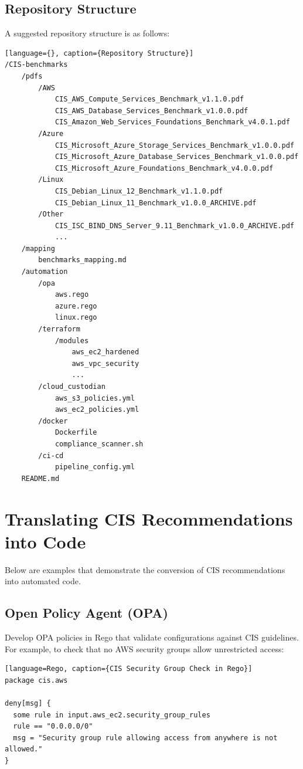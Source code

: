 \documentclass[12pt]{article}
\begin{document}
\subsection{Repository Structure}
A suggested repository structure is as follows:
\begin{verbatim}[language={}, caption={Repository Structure}]
/CIS-benchmarks
    /pdfs
        /AWS
            CIS_AWS_Compute_Services_Benchmark_v1.1.0.pdf
            CIS_AWS_Database_Services_Benchmark_v1.0.0.pdf
            CIS_Amazon_Web_Services_Foundations_Benchmark_v4.0.1.pdf
        /Azure
            CIS_Microsoft_Azure_Storage_Services_Benchmark_v1.0.0.pdf
            CIS_Microsoft_Azure_Database_Services_Benchmark_v1.0.0.pdf
            CIS_Microsoft_Azure_Foundations_Benchmark_v4.0.0.pdf
        /Linux
            CIS_Debian_Linux_12_Benchmark_v1.1.0.pdf
            CIS_Debian_Linux_11_Benchmark_v1.0.0_ARCHIVE.pdf
        /Other
            CIS_ISC_BIND_DNS_Server_9.11_Benchmark_v1.0.0_ARCHIVE.pdf
            ...
    /mapping
        benchmarks_mapping.md
    /automation
        /opa
            aws.rego
            azure.rego
            linux.rego
        /terraform
            /modules
                aws_ec2_hardened
                aws_vpc_security
                ...
        /cloud_custodian
            aws_s3_policies.yml
            aws_ec2_policies.yml
        /docker
            Dockerfile
            compliance_scanner.sh
        /ci-cd
            pipeline_config.yml
    README.md
\end{verbatim}

\section{Translating CIS Recommendations into Code}
Below are examples that demonstrate the conversion of CIS recommendations into automated code.

\subsection{Open Policy Agent (OPA)}
Develop OPA policies in Rego that validate configurations against CIS guidelines. For example, to check that no AWS security groups allow unrestricted access:
\begin{verbatim}[language=Rego, caption={CIS Security Group Check in Rego}]
package cis.aws

deny[msg] {
  some rule in input.aws_ec2.security_group_rules
  rule == "0.0.0.0/0"
  msg = "Security group rule allowing access from anywhere is not allowed."
}
\end{verbatim}
\end{document}
